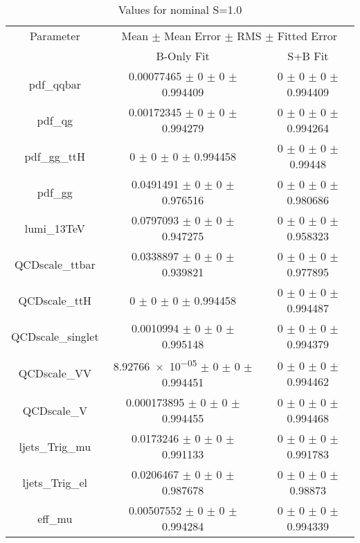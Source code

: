 \begin{table}
\centering
\caption{Values for nominal S=1.0}
\begin{tabular}{ccc}
\toprule
Parameter & \multicolumn{2}{c}{Mean $\pm$ Mean Error $\pm$ RMS $\pm$ Fitted Error}\\
 & B-Only Fit & S+B Fit\\
\midrule
pdf\_qqbar & \num{0.00077465} $\pm$ \num{0} $\pm$ \num{0} $\pm$ \num{0.994409} & \num{0} $\pm$ \num{0} $\pm$ \num{0} $\pm$ \num{0.994409}\\
pdf\_qg & \num{0.00172345} $\pm$ \num{0} $\pm$ \num{0} $\pm$ \num{0.994279} & \num{0} $\pm$ \num{0} $\pm$ \num{0} $\pm$ \num{0.994264}\\
pdf\_gg\_ttH & \num{0} $\pm$ \num{0} $\pm$ \num{0} $\pm$ \num{0.994458} & \num{0} $\pm$ \num{0} $\pm$ \num{0} $\pm$ \num{0.99448}\\
pdf\_gg & \num{0.0491491} $\pm$ \num{0} $\pm$ \num{0} $\pm$ \num{0.976516} & \num{0} $\pm$ \num{0} $\pm$ \num{0} $\pm$ \num{0.980686}\\
lumi\_13TeV & \num{0.0797093} $\pm$ \num{0} $\pm$ \num{0} $\pm$ \num{0.947275} & \num{0} $\pm$ \num{0} $\pm$ \num{0} $\pm$ \num{0.958323}\\
QCDscale\_ttbar & \num{0.0338897} $\pm$ \num{0} $\pm$ \num{0} $\pm$ \num{0.939821} & \num{0} $\pm$ \num{0} $\pm$ \num{0} $\pm$ \num{0.977895}\\
QCDscale\_ttH & \num{0} $\pm$ \num{0} $\pm$ \num{0} $\pm$ \num{0.994458} & \num{0} $\pm$ \num{0} $\pm$ \num{0} $\pm$ \num{0.994487}\\
QCDscale\_singlet & \num{0.0010994} $\pm$ \num{0} $\pm$ \num{0} $\pm$ \num{0.995148} & \num{0} $\pm$ \num{0} $\pm$ \num{0} $\pm$ \num{0.994379}\\
QCDscale\_VV & \num{8.92766e-05} $\pm$ \num{0} $\pm$ \num{0} $\pm$ \num{0.994451} & \num{0} $\pm$ \num{0} $\pm$ \num{0} $\pm$ \num{0.994462}\\
QCDscale\_V & \num{0.000173895} $\pm$ \num{0} $\pm$ \num{0} $\pm$ \num{0.994455} & \num{0} $\pm$ \num{0} $\pm$ \num{0} $\pm$ \num{0.994468}\\
ljets\_Trig\_mu & \num{0.0173246} $\pm$ \num{0} $\pm$ \num{0} $\pm$ \num{0.991133} & \num{0} $\pm$ \num{0} $\pm$ \num{0} $\pm$ \num{0.991783}\\
ljets\_Trig\_el & \num{0.0206467} $\pm$ \num{0} $\pm$ \num{0} $\pm$ \num{0.987678} & \num{0} $\pm$ \num{0} $\pm$ \num{0} $\pm$ \num{0.98873}\\
eff\_mu & \num{0.00507552} $\pm$ \num{0} $\pm$ \num{0} $\pm$ \num{0.994284} & \num{0} $\pm$ \num{0} $\pm$ \num{0} $\pm$ \num{0.994339}\\

\end{tabular}
\end{table}
